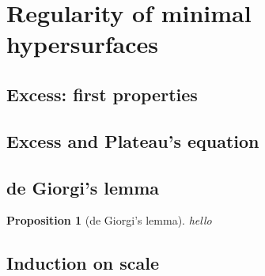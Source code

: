 \documentclass[reqno,12pt,letterpaper]{amsart}
\newtheorem{proposition}[theorem]{Proposition}
\theoremstyle{definition}
\numberwithin{equation}{section}
\begin{document}

\section{Regularity of minimal hypersurfaces}\label{de Giorgi section}
\subsection{Excess: first properties}
\subsection{Excess and Plateau's equation}
\subsection{de Giorgi's lemma}
\begin{proposition}[de Giorgi's lemma]\label{dGL final}
hello
\end{proposition}
\subsection{Induction on scale}


\printbibliography
\end{document}
